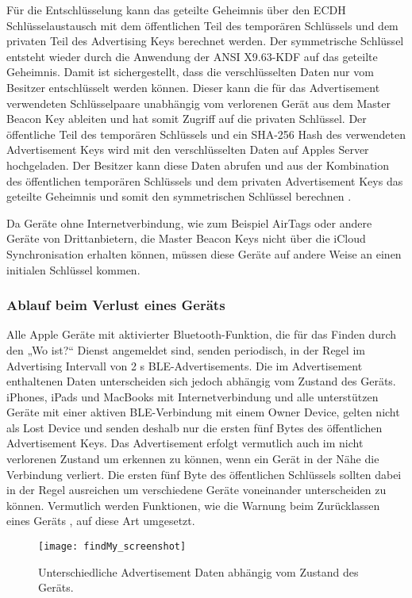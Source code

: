 Für die Entschlüsselung kann das geteilte Geheimnis über den \ac{ECDH} Schlüsselaustausch mit dem öffentlichen Teil des temporären Schlüssels und dem privaten Teil des Advertising Keys berechnet werden.
Der symmetrische Schlüssel entsteht wieder durch die Anwendung der ANSI X9.63-\ac{KDF} auf das geteilte Geheimnis.
Damit ist sichergestellt, dass die verschlüsselten Daten nur vom Besitzer entschlüsselt werden können.
Dieser kann die für das Advertisement verwendeten Schlüsselpaare unabhängig vom verlorenen Gerät aus dem Master Beacon Key ableiten und hat somit Zugriff auf die privaten Schlüssel.
Der öffentliche Teil des temporären Schlüssels und ein \ac{SHA}-256 Hash des verwendeten Advertisement Keys wird mit den verschlüsselten Daten auf Apples Server hochgeladen.
Der Besitzer kann diese Daten abrufen und aus der Kombination des öffentlichen temporären Schlüssels und dem privaten Advertisement Keys das geteilte Geheimnis und somit den symmetrischen Schlüssel berechnen \cite{Heinrich_FindMy}.

Da Geräte ohne Internetverbindung, wie zum Beispiel AirTags oder andere Geräte von Drittanbietern, die Master Beacon Keys nicht über die iCloud Synchronisation erhalten können, müssen diese Geräte auf andere Weise an einen initialen Schlüssel kommen.

\subsubsection{Ablauf beim Verlust eines Geräts}
\label{sec:Verlust}

Alle Apple Geräte mit aktivierter Bluetooth-Funktion, die für das Finden durch den „Wo ist?“ Dienst angemeldet sind, senden periodisch, in der Regel im Advertising Intervall von 2 s \ac{BLE}-Advertisements.
Die im Advertisement enthaltenen Daten unterscheiden sich jedoch abhängig vom Zustand des Geräts.
iPhones, iPads und MacBooks mit Internetverbindung und alle unterstützen Geräte mit einer aktiven \ac{BLE}-Verbindung mit einem Owner Device, gelten nicht als Lost Device und senden deshalb nur die ersten fünf Bytes des öffentlichen Advertisement Keys.
Das Advertisement erfolgt vermutlich auch im nicht verlorenen Zustand um erkennen zu können, wenn ein Gerät in der Nähe die Verbindung verliert.
Die ersten fünf Byte des öffentlichen Schlüssels sollten dabei in der Regel ausreichen um verschiedene Geräte voneinander unterscheiden zu können.
Vermutlich werden Funktionen, wie die Warnung beim Zurücklassen eines Geräts \cite{Apple_FindMyWarning}, auf diese Art umgesetzt.
\begin{figure}[ht]
    \centering
    \texttt{[image: findMy\_screenshot]}
    \caption{Unterschiedliche Advertisement Daten abhängig vom Zustand des Geräts.}
    \label{fig:findMy_screenshot}
\end{figure}

